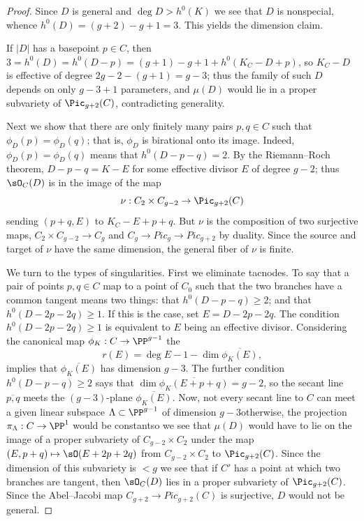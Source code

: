 \begin{proof}
Since $D$ is general and $\deg D > h^{0}(K)$ we see
that $D$ is nonspecial, whence $h^0(D) = (g+2)-g+1 = 3$.
This yields the dimension claim.

If $|D|$ 
has
a basepoint $p\in C$, then $3=h^0(D)
= h^0(D-p) = (g+1)-g+1+h^0(K_C-D+p)$,
so $K_C-D$ is effective of degree $2g-2-(g+1) =g-3$; thus the family of
such $D$ depends on only $g-3+1$ parameters,
and $\mu(D)$ would lie in a proper subvariety of $\Pic_{g+2}(C)$,
contradicting generality.

Next we show that
there are only finitely many pairs $p,
q \in C$ such that $\phi_D(p) = \phi_D(q)$; that is, $\phi_D$
is birational onto its image. 
Indeed, $\phi_D(p) = \phi_D(q)$
 means that $h^0(D-p-q) = 2$. By the Riemann--Roch
 theorem, $D-p-q = K-E$ for some effective divisor $E$ of degree $g-2$;
 thus $\sO_C(D)$ is in the image of the map
$$
\nu : C_2 \times C_{g-2} \to \Pic_{g+2}(C)
$$
sending $(p+q, E)$ to $K_C - E + p + q$.
But
$\nu$ is
the composition of two surjective maps, $C_2 \times C_{g-2} \to C_g$
and $C_g\to Pic_g \to Pic_{g+2}$ by duality. Since the source and
target of $\nu$ have the same dimension, the general fiber of $\nu$ is
finite. 

We turn to the types of singularities. First we eliminate tacnodes.
To say that a pair of points $p, q \in C$ map to
a point of $C_0$ such that the
two branches have a common tangent means two things: that $h^0(D-p-q)
\geq 2$; and that $h^0(D-2p-2q) \geq 1$. If this is the case, set $E =
D - 2p - 2q$.  The condition $h^0(D-2p-2q) \geq 1$ is equivalent to
$E$ being an effective divisor. Considering the canonical map $\phi_K:
C\to \PP^{g-1}$
the 
%
$$r(E) = \deg E -1-\dim\overline{\phi_K(E)},$$ 
implies that $\overline {\phi_K(E)}$ has
dimension $g-3$. The 
further
condition $h^0(D-p-q) \geq 2$ says that
$\dim\overline{\phi_K(E+p+q)} = g-2$,
so the secant line $\overline{p,q}$ meets the $(g-3)$-plane
$\overline{\phi_K(E)}$. Now, not every secant line to $C$ can meet
a given linear subspace $\Lambda \subset \PP^{g-1}$ of dimension
$g-3$\emdash otherwise, the projection $\pi_\Lambda : C \to \PP^1$ would
be constant\emdash so we see that $\mu(D)$ would have to lie on the image
of a proper subvariety of $C_{g-2} \times C_2$ under the map $(E, p+q)
\mapsto \sO(E+2p+2q)$ from $C_{g-2} \times C_2$ to $\Pic_{g+2}(C)$.
Since the dimension of this subvariety is $<g$ we see that if $C'$ has
a point at which two branches are tangent, then $\sO_C(D)$ lies in a
proper subvariety of $\Pic_{g+2}(C)$. Since
the Abel--Jacobi map $C_{g+2} \to Pic_{g+2}(C)$ is surjective,
 $D$ would not be general.


\end{proof}
